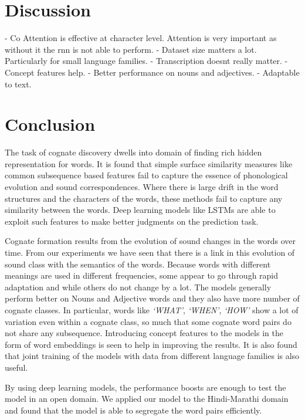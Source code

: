 \documentclass[11pt,letterpaper]{article}
\begin{document}
\section{Discussion}
- Co Attention is effective at character level. Attention is very important as without it the rnn is not able to perform.
- Dataset size matters a lot. Particularly for small language families.
- Transcription doesnt really matter.
- Concept features help.
- Better performance on nouns and adjectives.
- Adaptable to text.

\section{Conclusion}

The task of cognate discovery dwells into domain of finding rich hidden representation for words. It is found that simple surface similarity measures like common subsequence based features fail to capture the essence of phonological evolution and sound correspondences. Where there is large drift in the word structures and the characters of the words, these methods fail to capture any similarity between the words. Deep learning models like LSTMs are able to exploit such features to make better judgments on the prediction task. 

Cognate formation results from the evolution of sound changes in the words over time. From our experiments we have seen that there is a link in this evolution of sound class with the semantics of the words. Because words with different meanings are used in different frequencies, some appear to go through rapid adaptation and while others do not change by a lot. The models generally perform better on Nouns and Adjective words and they also have more number of cognate classes. In particular, words like \textit{`WHAT'}, \textit{`WHEN'}, \textit{`HOW'} show a lot of variation even within a cognate class, so much that some cognate word pairs do not share any subsequence. Introducing concept features to the models in the form of word embeddings is seen to help in improving the results. It is also found that joint training of the models with data from different language families is also useful.

By using deep learning models, the performance boosts are enough to test the model in an open domain. We applied our model to the Hindi-Marathi domain and found that the model is able to segregate the word pairs efficiently. 



\end{document}
